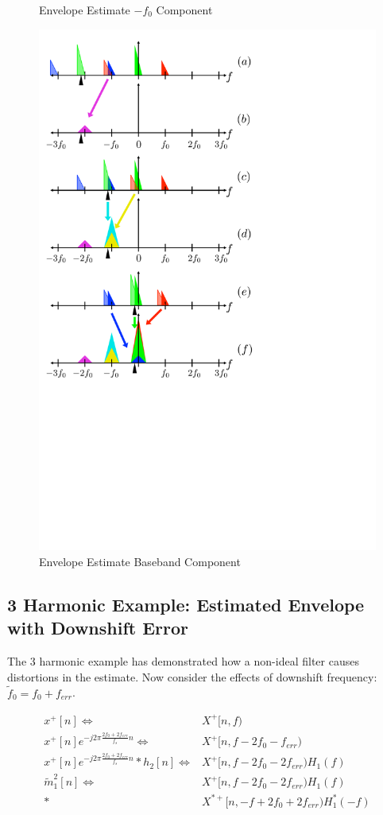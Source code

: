 \documentclass [11pt, proquest,oneside] {ganter_thesis}[2015/03/03]
\begin{document}
\begin{figure}[!ht]
    \caption{Envelope Estimate $-f_0$ Component}\label{fig:harmonic_envelope_F0}
    \includegraphics[width=.62\textwidth]{harmonic_envelope_0}
    \caption{Envelope Estimate Baseband Component}\label{fig:harmonic_envelope_0}
\end{figure}

\clearpage

\subsection{3 Harmonic Example: Estimated Envelope with Downshift Error}

The 3 harmonic example has demonstrated how a non-ideal filter causes distortions in the estimate.  Now consider the effects of downshift frequency: $\tilde{f}_0 = f_0 + f_{err}$.

\begin{align}
\label{eq:harmonic_estimate_ERR_fig_a}
x^+[n] \Longleftrightarrow& X^+[n,f) \\
%
x^+[n]e^{-j2\pi \frac{2f_0 + 2f_{err}}{f_s}n} \Longleftrightarrow& X^+[n,f - 2f_0 - f_{err}) \\
%
\label{eq:harmonic_estimate_ERR_fig_c}
x^+[n]e^{-j2\pi \frac{2f_0 + 2f_{err}}{f_s}n} * h_2[n] \Longleftrightarrow& X^+[n,f - 2f_0 - 2f_{err}) H_1(f) \\
%
\tilde{m}_1^2[n] \Longleftrightarrow& X^+[n,f - 2f_0 - 2f_{err}) H_1(f) \nonumber \\
\label{eq:harmonic_estimate_ERR_fig_e}
*& X^{*+}[n,-f + 2f_0 + 2f_{err}) H_1^*(-f)
\end{align}
\end{document}
